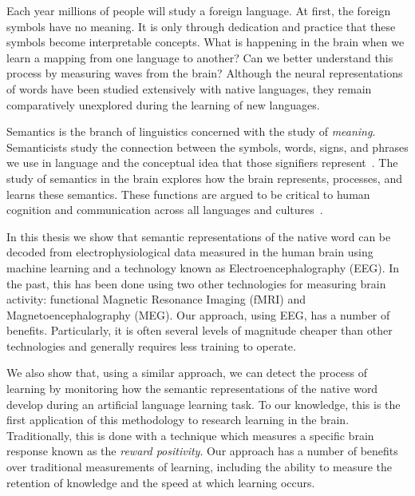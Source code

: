 \label{chapter:introduction}

Each year millions of people will study a foreign language. At first, the 
foreign symbols have no meaning. It is only through dedication and practice 
that these symbols become interpretable concepts. What is happening in the 
brain when we learn a mapping from one language to another? Can we better 
understand this process by measuring waves from the brain? Although the neural 
representations of words have been studied extensively with native languages,
they remain comparatively unexplored during the learning of new languages.
 
Semantics is the branch of linguistics concerned with the study of 
\emph{meaning}. Semanticists study the connection between the symbols, words, 
signs, and phrases we use in language and the conceptual idea that those 
signifiers represent~\cite{kreidler2002introducing}. The study of semantics in 
the brain explores how the brain represents, processes, and learns these 
semantics. These functions are argued to be critical to human cognition and 
communication across all languages and cultures~\cite{croft2004cognitive}.

In this thesis we show that semantic representations of the native word can be 
decoded from electrophysiological data measured in the human brain using 
machine learning and a technology known as Electroencephalography (EEG). In the 
past, this has been done using two other technologies for measuring brain 
activity: functional Magnetic Resonance Imaging (fMRI) and 
Magnetoencephalography (MEG).  Our approach, using EEG, has a number of 
benefits. Particularly, it is often several levels of magnitude cheaper than 
other technologies and generally requires less training to operate.

We also show that, using a similar approach, we can detect the process of 
learning by monitoring how the semantic representations of the native word 
develop during an artificial language learning task. To our knowledge, this is 
the first application of this methodology to research learning in the brain.  
Traditionally, this is done with a technique which measures a specific brain 
response known as the \emph{reward positivity}. Our approach has a number of 
benefits over traditional measurements of learning, including the ability to 
measure the retention of knowledge and the speed at which learning occurs.






